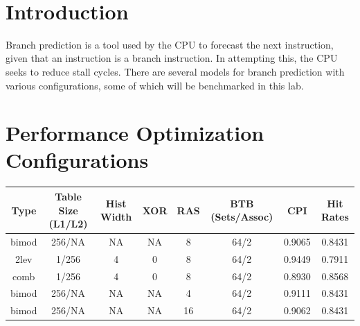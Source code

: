 \documentclass[twocolumn]{article}
\begin{document}
\

{\newpage}

\maketitle        


\section{Introduction}

Branch prediction is a tool used by the CPU to forecast the next instruction, given that an instruction is a branch instruction. In attempting this, the CPU seeks to reduce stall cycles. There are several models for branch prediction with various configurations, some of which will be benchmarked in this lab. 

\section{Performance Optimization Configurations}


\begingroup
    \medskip
    \centering
    \def\arraystretch{1.5}
        \scriptsize{
        \begin{tabular}{cccccccc}
            \toprule
            Type & Table Size (L1/L2) & Hist Width & XOR & RAS & BTB (Sets/Assoc) & CPI & Hit Rates\\
             \midrule
            bimod & 256/NA & NA & NA & 8 & 64/2 & 0.9065 & 0.8431\\
            2lev & 1/256 & 4 & 0 & 8 & 64/2 & 0.9449 & 0.7911\\
            comb & 1/256 & 4 & 0 & 8 & 64/2 & 0.8930 & 0.8568\\
            bimod & 256/NA & NA & NA & 4 & 64/2 & 0.9111 & 0.8431\\
            bimod & 256/NA & NA & NA & 16 & 64/2 & 0.9062 & 0.8431\\
            \bottomrule
        \end{tabular}
        }
    \label{fig:}
    \medskip
\endgroup
\end{document}
